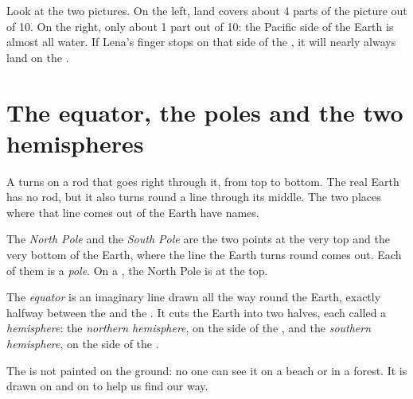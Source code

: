 \begin{remark}\label{rem:g3:continents-and-oceans:halves}
Look at the two pictures. On the left, land covers about 4 parts of the
picture out of 10. On the right, only about 1 part out of 10: the Pacific
side of the Earth is almost all water. If Lena's finger stops on that side
of the , it will nearly always land on the .
\end{remark}

\section{The equator, the poles and the two hemispheres}

A  turns on a rod that goes right through it, from top to bottom.
The real Earth has no rod, but it also turns round a line through its
middle. The two places where that line comes out of the Earth have names.

\begin{definition}[Pole]\label{def:g3:continents-and-oceans:poles}
The \emph{North Pole} and the \emph{South
Pole} are the two points at the very top and the very
bottom of the Earth, where the line the Earth turns round comes out. Each
of them is a \emph{pole}. On a , the North Pole is at the
top.
\end{definition}

\begin{definition}\label{def:g3:continents-and-oceans:equator}
The \emph{equator} is an imaginary line drawn all the way
round the Earth, exactly halfway between the  and the .
It cuts the Earth into two halves, each called a
\emph{hemisphere}: the \emph{northern
hemisphere}, on the side of the , and
the \emph{southern hemisphere}, on the side of
the .
\end{definition}

The  is not painted on the ground: no one can see it on a beach or in
a forest. It is drawn on  and on  to help us find our way.


